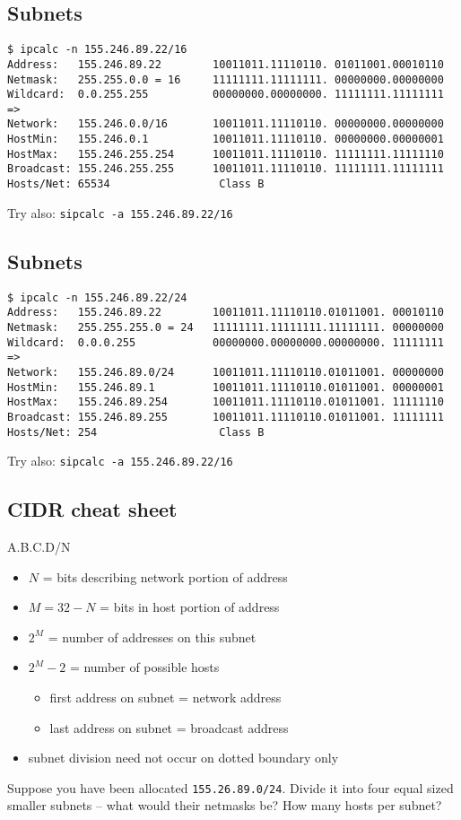 \documentclass[xga]{xdvislides}
\begin{document}
\subsection{Subnets}
\begin{verbatim}
$ ipcalc -n 155.246.89.22/16
Address:   155.246.89.22        10011011.11110110. 01011001.00010110
Netmask:   255.255.0.0 = 16     11111111.11111111. 00000000.00000000
Wildcard:  0.0.255.255          00000000.00000000. 11111111.11111111
=>
Network:   155.246.0.0/16       10011011.11110110. 00000000.00000000
HostMin:   155.246.0.1          10011011.11110110. 00000000.00000001
HostMax:   155.246.255.254      10011011.11110110. 11111111.11111110
Broadcast: 155.246.255.255      10011011.11110110. 11111111.11111111
Hosts/Net: 65534                 Class B
\end{verbatim}
\vspace{.5in}
Try also: \verb+sipcalc -a 155.246.89.22/16+

\subsection{Subnets}
\begin{verbatim}
$ ipcalc -n 155.246.89.22/24
Address:   155.246.89.22        10011011.11110110.01011001. 00010110
Netmask:   255.255.255.0 = 24   11111111.11111111.11111111. 00000000
Wildcard:  0.0.0.255            00000000.00000000.00000000. 11111111
=>
Network:   155.246.89.0/24      10011011.11110110.01011001. 00000000
HostMin:   155.246.89.1         10011011.11110110.01011001. 00000001
HostMax:   155.246.89.254       10011011.11110110.01011001. 11111110
Broadcast: 155.246.89.255       10011011.11110110.01011001. 11111111
Hosts/Net: 254                   Class B
\end{verbatim}
\vspace{.5in}
Try also: \verb+sipcalc -a 155.246.89.22/16+

\subsection{CIDR cheat sheet}
A.B.C.D/N
\begin{itemize}
	\item $N$ = bits describing network portion of address
	\item $M=32-N$ = bits in host portion of address
	\item $2^M$ = number of addresses on this subnet
	\item $2^M - 2$ = number of possible hosts
		\begin{itemize}
			\item first address on subnet = network address
			\item last address on subnet = broadcast address
		\end{itemize}
	\item subnet division need not occur on dotted boundary only
\end{itemize}
\addvspace{.5in}
Suppose you have been allocated {\tt 155.26.89.0/24}.  Divide it into four
equal sized smaller subnets -- what would their netmasks be?  How many
hosts per subnet?
\end{document}
